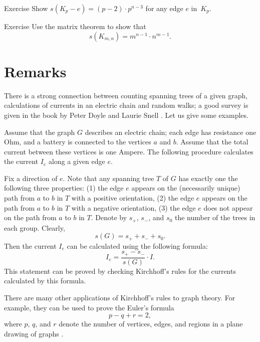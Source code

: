 \begin{thm}{Exercise}\label{ex:s(Kp-e)}
Show $s(K_p-e)=(p-2)\cdot p^{n-3}$ for any edge $e$ in~$K_p$. 
\end{thm}

\begin{thm}{Exercise}\label{ex:s(Kmn)}
Use the matrix theorem to show that 
\[s(K_{m,n})=m^{n-1}\cdot n^{m-1}.\]
\end{thm}



\section{Remarks}

There is a strong connection between counting spanning trees of a given graph,
calculations of currents in an electric chain 
and random walks; a good survey is given in the book by Peter Doyle and Laurie Snell \cite{doyle-snell}.
Let us give some examples.

Assume that the graph $G$ describes an electric chain;
each edge has resistance one Ohm,  and a battery is connected to the vertices $a$ and $b$.
Assume that the total current between these vertices is one Ampere.
The following procedure calculates the current $I_e$ along a given edge $e$.

Fix a direction of $e$.
Note that any spanning tree $T$ of $G$ has exactly one the following three properties:
(1) the edge $e$ appears on the (necessarily unique) path from $a$ to $b$ in $T$ with a positive orientation,
(2) the edge $e$ appears on the path from $a$ to $b$ in $T$ with a negative orientation,
(3) the edge $e$ does not appear on the path from $a$ to $b$ in $T$.
Denote by $s_+$, $s_-$, and $s_0$ the number of the trees in each group.
Clearly,
\[s(G)=s_++s_-+s_0.\]
Then  the current $I_e$ can be calculated using the following formula:
\[I_e=\frac{s_+-s_-}{s(G)}\cdot I.\]
This statement can be proved by checking Kirchhoff's rules for the currents calculated by this formula.

There are many other applications of Kirchhoff's rules to graph theory.
For example, they can be used to prove the Euler's formula
\[p-q+r=2,\]
where $p$, $q$, and $r$ denote the number of vertices, edges, and regions in a plane drawing of graphs \cite{levi}.



